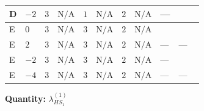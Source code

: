 \documentclass[8pt]{article}
\begin{document}
\begin{landscape}
\begin{longtable}{@{}llcccccc >{\raggedright\arraybackslash}p{0.21\linewidth} >{\raggedright\arraybackslash}p{0.21\linewidth} >{\raggedright\arraybackslash}p{0.21\linewidth}@{}}
\midrule
D & $-2$ & $3$ & $\text{N/A}$ & $1$ & $\text{N/A}$ & $2$ & $\text{N/A}$ & --- & \scriptsize\adjustbox{max width=\linewidth}{$\begin{gathered} +4 {\lambda_{X_{12}}} \left({\lambda_{X_{12}}}\right)^{*}\end{gathered}$} & \scriptsize\adjustbox{max width=\linewidth}{$\begin{gathered} -\frac{33 {g_2}^2 {\lambda_{HS_1}^{(1)}}}{2}\end{gathered}$} \\
\midrule
E & $0$ & $3$ & $\text{N/A}$ & $3$ & $\text{N/A}$ & $2$ & $\text{N/A}$ & \scriptsize\adjustbox{max width=\linewidth}{$\begin{gathered} +4 {\lambda_{X_{18}}} (5 \left({\lambda_{X_{9}}}\right)^{*}+4 \left({\lambda_{X_{18}}}\right)^{*})\end{gathered}$} & \scriptsize\adjustbox{max width=\linewidth}{$\begin{gathered} +4 {\lambda_{X_{14}}} \left({\lambda_{X_{14}}}\right)^{*}\end{gathered}$} & \scriptsize\adjustbox{max width=\linewidth}{$\begin{gathered} -\frac{33 {g_2}^2 {\lambda_{HS_1}^{(1)}}}{2}\end{gathered}$} \\
\midrule
E & $2$ & $3$ & $\text{N/A}$ & $3$ & $\text{N/A}$ & $2$ & $\text{N/A}$ & --- & --- & \scriptsize\adjustbox{max width=\linewidth}{$\begin{gathered} -\frac{33 {g_2}^2 {\lambda_{HS_1}^{(1)}}}{2}\end{gathered}$} \\
\midrule
E & $-2$ & $3$ & $\text{N/A}$ & $3$ & $\text{N/A}$ & $2$ & $\text{N/A}$ & --- & \scriptsize\adjustbox{max width=\linewidth}{$\begin{gathered} +4 {\lambda_{X_{12}}} \left({\lambda_{X_{12}}}\right)^{*}\end{gathered}$} & \scriptsize\adjustbox{max width=\linewidth}{$\begin{gathered} -\frac{33 {g_2}^2 {\lambda_{HS_1}^{(1)}}}{2}\end{gathered}$} \\
\midrule
E & $-4$ & $3$ & $\text{N/A}$ & $3$ & $\text{N/A}$ & $2$ & $\text{N/A}$ & --- & --- & \scriptsize\adjustbox{max width=\linewidth}{$\begin{gathered} -\frac{33 {g_2}^2 {\lambda_{HS_1}^{(1)}}}{2}\end{gathered}$} \\
\midrule
\bottomrule
\end{longtable}
\clearpage
\noindent\textbf{Quantity: }$\lambda_{HS_1}^{(1)}$\par\smallskip

\end{landscape}
\end{document}
